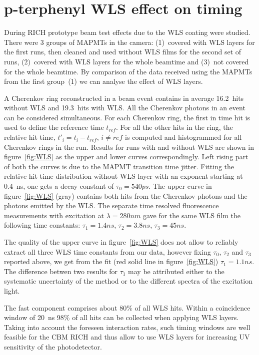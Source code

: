 \documentclass[final,5p,times,twocolumn]{elsarticle}
\begin{document}
\section{p-terphenyl WLS effect on timing}

During RICH prototype beam test effects due to the WLS coating were studied. There were 3 groups of MAPMTs in the camera: (1)~covered with WLS layers for the first runs, then cleaned and used without WLS films for the second set of runs, (2)~covered with WLS layers for the whole beamtime and (3)~not covered for the whole beamtime. By comparison of the data received using the MAPMTs from the first group~(1) we can analyse the effect of WLS layers.

A Cherenkov ring reconstructed in a beam event contains in average 16.2~hits without WLS and 19.3~hits with WLS. All the Cherenkov photons in an event can be considered simultaneous. For each Cherenkov ring, the first in time hit is used to define the reference time $ t_{ref} $. For all the other hits in the ring, the relative hit time, $ t'_i = t_i - t_{ref} $, $ i \neq ref $ is computed and histogrammed for all Cherenkov rings in the run. Results for runs with and without WLS are shown in figure~\ref{fig:WLS} as the upper and lower curves correspondingly. Left rising part of both the curves is due to the MAPMT transition time jitter. Fitting the relative hit time distribution without WLS layer with an exponent starting at 0.4~ns, one gets a decay constant of $ \tau_0 = 540ps$. The upper curve in figure~\ref{fig:WLS} (gray) contains both hits from the Cherenkov photons and the photons emitted by the WLS. The separate time resolved fluorescence measurements with excitation at $\lambda=280nm$ gave for the same WLS film the following time constants: $ \tau_1 = 1.4 ns $, $ \tau_2 = 3.8 ns $, $ \tau_3 = 45 ns $.

The quality of the upper curve in figure~\ref{fig:WLS} does not allow to reliably extract all three WLS time constants from our data, however fixing $ \tau_0$, $\tau_2$ and $\tau_3$ reported above, we get from the fit (red solid line in figure~\ref{fig:WLS}) $\tau_1=1.1ns$. The difference betwen two results for $\tau_1$ may be attributed either to the systematic uncertainty of the method or to the different spectra of the excitation light.

The fast component comprises about 80\% of all WLS hits. Within a coincidence window of 20~ns 98\% of all hits can be collected when applying WLS layers. Taking into account the foreseen interaction rates, such timing windows are well feasible for the CBM RICH and thus allow to use WLS layers for increasing UV sensitivity of the photodetector.
\end{document}
